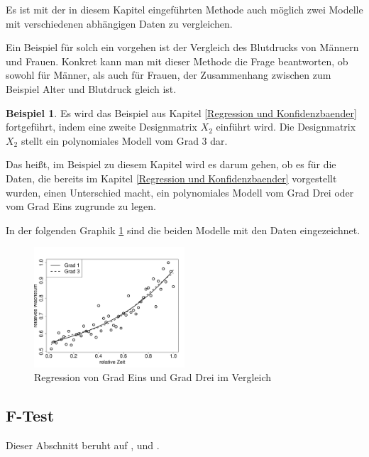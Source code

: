 \documentclass[12pt,a4paper]{article}
\theoremstyle{definition}
\newtheorem{Beispiel}[Definition]{Beispiel}
\theoremstyle{definition}
\theoremstyle{definition}
\theoremstyle{definition}
\newcommand{\Ydat}{...}
\newcommand{\edat}{...}
\newcommand{\Xtwodat}[0]{...}
\newcommand{\Xonedat}[0]{...}
\newcommand{\betatwodat}[0]{\left[ \begin{array}{c} \beta_{0,2} \\ \beta_{1,2} \\ \beta_{1,3} \\ \beta_{1,4} \end{array} \right]}
\newcommand{\betaonedat}[0]{\left[ \begin{array}{c} \beta_{0,1} \\ \beta_{1,1} \end{array} \right]}
\begin{document}
Es ist mit der in diesem Kapitel eingeführten Methode auch möglich zwei Modelle mit verschiedenen abhängigen Daten zu vergleichen. 

Ein Beispiel für solch ein vorgehen ist der Vergleich des Blutdrucks von Männern und Frauen. Konkret kann man mit dieser Methode die Frage beantworten, ob sowohl für Männer, als auch für Frauen, der Zusammenhang zwischen zum Beispiel Alter und Blutdruck gleich ist.

\begin{Beispiel}
Es wird das Beispiel aus Kapitel \ref{Regression und Konfidenzbaender} fortgeführt, indem eine zweite Designmatrix $X_2$ einführt wird. Die Designmatrix $X_2$ stellt ein polynomiales Modell vom Grad 3 dar. 

Das heißt, im Beispiel zu diesem Kapitel wird es darum gehen, ob es für die Daten, die bereits im Kapitel \ref{Regression und Konfidenzbaender} vorgestellt wurden, einen Unterschied macht, ein polynomiales Modell vom Grad Drei oder vom Grad Eins zugrunde zu legen. 

In der folgenden Graphik \ref{Vergleich-Bsp} sind die beiden Modelle mit den Daten eingezeichnet.

\begin{figure}[H] 
  \centering
     \includegraphics[width=0.5\textwidth]{Bsp-beide-in-einem-plot}
  \caption{Regression von Grad Eins und Grad Drei im Vergleich}
  \label{Vergleich-Bsp}
\end{figure}

%
\end{Beispiel}




\subsection{F-Test}
\label{Vergleich F-Test}
Dieser Abschnitt beruht auf \cite[9-15]{Liu64} ,\cite[114-115]{Liu64} und \cite{Draper98}.
\end{document}
